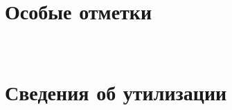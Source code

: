 





\chapter{Особые отметки}

	\noindent\underline{\hspace\textwidth}
	\noindent\underline{\hspace\textwidth}	
	\noindent\underline{\hspace\textwidth}
	\noindent\underline{\hspace\textwidth}
	\noindent\underline{\hspace\textwidth}
	\noindent\underline{\hspace\textwidth}	
	\noindent\underline{\hspace\textwidth}
	\noindent\underline{\hspace\textwidth}
	\noindent\underline{\hspace\textwidth}
	\noindent\underline{\hspace\textwidth}	
	\noindent\underline{\hspace\textwidth}
	\noindent\underline{\hspace\textwidth}
	\noindent\underline{\hspace\textwidth}
	\noindent\underline{\hspace\textwidth}	
	\noindent\underline{\hspace\textwidth}
	\noindent\underline{\hspace\textwidth}
	\noindent\underline{\hspace\textwidth}
	\noindent\underline{\hspace\textwidth}	
	\noindent\underline{\hspace\textwidth}
	\noindent\underline{\hspace\textwidth}			
	\newline
	
\newpage 

	\noindent\underline{\hspace\textwidth}
	\noindent\underline{\hspace\textwidth}	
	\noindent\underline{\hspace\textwidth}
	\noindent\underline{\hspace\textwidth}
	\noindent\underline{\hspace\textwidth}
	\noindent\underline{\hspace\textwidth}	
	\noindent\underline{\hspace\textwidth}
	\noindent\underline{\hspace\textwidth}
	\noindent\underline{\hspace\textwidth}
	\noindent\underline{\hspace\textwidth}	
	\noindent\underline{\hspace\textwidth}
	\noindent\underline{\hspace\textwidth}
	\noindent\underline{\hspace\textwidth}
	\noindent\underline{\hspace\textwidth}	
	\noindent\underline{\hspace\textwidth}
	\noindent\underline{\hspace\textwidth}
	\noindent\underline{\hspace\textwidth}
	\noindent\underline{\hspace\textwidth}	
	\noindent\underline{\hspace\textwidth}
	\noindent\underline{\hspace\textwidth}			
	\newline
\ %

\newpage


\chapter{Сведения об утилизации}

